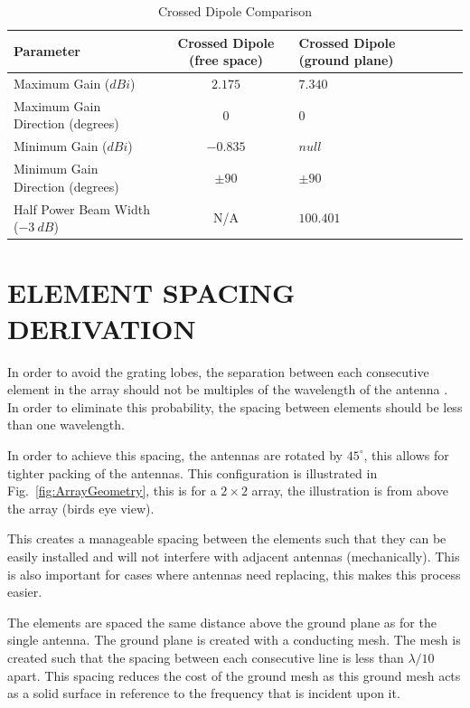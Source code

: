 \documentclass[11pt]{witseiepaper}
\begin{document}
\begin{bibunit}[witseie]
\begin{table}[htb]
    \caption{Crossed Dipole Comparison}
    \label{tab:AntennaConfigurations}
    \begin{center}
        \begin{tabular}{p{60mm}cp{40mm}cp{40mm}}
            \hline 
            Parameter & Crossed Dipole (free space) & Crossed Dipole (ground plane) \\
            \hline
            Maximum Gain ($dBi$) & $2.175$ & $7.340$ \\
            Maximum Gain Direction (degrees) & $0$ & $0$ \\
            Minimum Gain ($dBi$) & $-0.835$ & $null$ \\
            Minimum Gain Direction (degrees) & $\pm 90$ & $\pm 90$ \\
            Half Power Beam Width ($-3~dB$) & N/A & $100.401$ \\
            \hline
        \end{tabular}
    \end{center}
\end{table}

\section{ELEMENT SPACING DERIVATION} \label{sec:ElementSpacingDerivation}
In order to avoid the grating lobes, the separation between each consecutive element in the array should not be multiples of the wavelength of the antenna \cite[p.~297]{Balanis}.
In order to eliminate this probability, the spacing between elements should be less than one wavelength.

In order to achieve this spacing, the antennas are rotated by $45^{\circ}$, this allows for tighter packing of the antennas. This configuration is illustrated in Fig.~\ref{fig:ArrayGeometry}, this is for a $2 \times 2$ array, the illustration is from above the array (birds eye view).

This creates a manageable spacing between the elements such that they can be easily installed and will not interfere with adjacent antennas (mechanically). This is also important for cases where antennas need replacing, this makes this process easier.

The elements are spaced the same distance above the ground plane as for the single antenna. The ground plane is created with a conducting mesh. The mesh is created such that the spacing between each consecutive line is less than $\lambda/10$ apart. This spacing reduces the cost of the ground mesh as this ground mesh acts as a solid surface in reference to the frequency that is incident upon it.


\end{bibunit}
\end{document}
